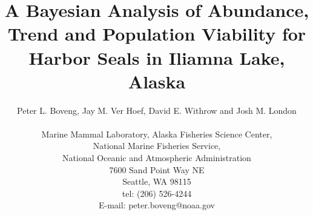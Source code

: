 \documentclass[12pt, titlepage]{article}\usepackage[]{graphicx}\usepackage[]{color}
\begin{document}

\titlepage
\title {A Bayesian Analysis of Abundance, Trend and Population Viability for Harbor Seals in Iliamna Lake, Alaska}
\author{Peter L. Boveng, Jay M. Ver Hoef, David E. Withrow and Josh M. London \\
\hrulefill \\ 
Marine Mammal Laboratory, Alaska Fisheries Science Center,\\
National Marine Fisheries Service, \\
National Oceanic and Atmospheric Administration\\
7600 Sand Point Way NE\\
Seattle, WA 98115\\
tel: (206) 526-4244\\
E-mail: peter.boveng@noaa.gov\\
\hrulefill \\
}

\maketitle

\end{document}
